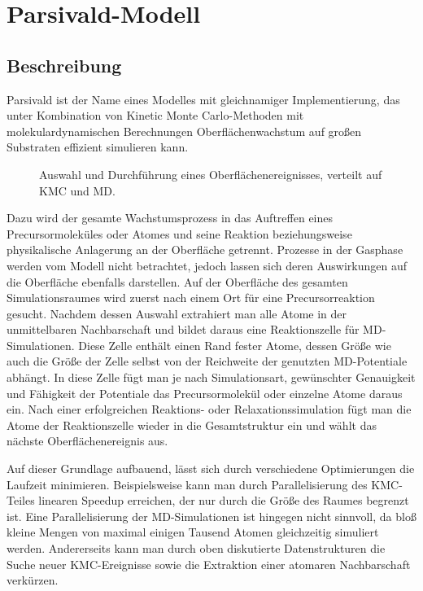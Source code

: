 \section{Parsivald-Modell}

\subsection{Beschreibung}

Parsivald ist der Name eines Modelles mit gleichnamiger Implementierung, das unter Kombination von Kinetic Monte Carlo-Methoden mit molekulardynamischen Berechnungen Oberflächenwachstum auf großen Substraten effizient simulieren kann.

\begin{figure}[tbh]
  \centering
  \def\svgwidth{\textwidth}
  
  \caption[Parsivald-Schema]{
    Auswahl und Durchführung eines Oberflächenereignisses, verteilt auf KMC und MD.
  }
  \label{fig:parsivald-schema}
\end{figure}

Dazu wird der gesamte Wachstumsprozess in das Auftreffen eines Precursormoleküles oder Atomes und seine Reaktion beziehungsweise physikalische Anlagerung an der Oberfläche getrennt.
Prozesse in der Gasphase werden vom Modell nicht betrachtet, jedoch lassen sich deren Auswirkungen auf die Oberfläche ebenfalls darstellen.
Auf der Oberfläche des gesamten Simulationsraumes wird zuerst nach einem Ort für eine Precursorreaktion gesucht.
Nachdem dessen Auswahl extrahiert man alle Atome in der unmittelbaren Nachbarschaft und bildet daraus eine Reaktionszelle für MD-Simulationen.
Diese Zelle enthält einen Rand fester Atome, dessen Größe wie auch die Größe der Zelle selbst von der Reichweite der genutzten MD-Potentiale abhängt.
In diese Zelle fügt man je nach Simulationsart, gewünschter Genauigkeit und Fähigkeit der Potentiale das Precursormolekül oder einzelne Atome daraus ein.
Nach einer erfolgreichen Reaktions- oder Relaxationssimulation fügt man die Atome der Reaktionszelle wieder in die Gesamtstruktur ein und wählt das nächste Oberflächenereignis aus.

Auf dieser Grundlage aufbauend, lässt sich durch verschiedene Optimierungen die Laufzeit minimieren.
Beispielsweise kann man durch Parallelisierung des KMC-Teiles linearen Speedup  erreichen, der nur durch die Größe des Raumes begrenzt ist.
Eine Parallelisierung der MD-Simulationen ist hingegen nicht sinnvoll, da bloß kleine Mengen von maximal einigen Tausend Atomen gleichzeitig simuliert werden.
Andererseits kann man durch oben diskutierte Datenstrukturen die Suche neuer KMC-Ereignisse sowie die Extraktion einer atomaren Nachbarschaft verkürzen.

